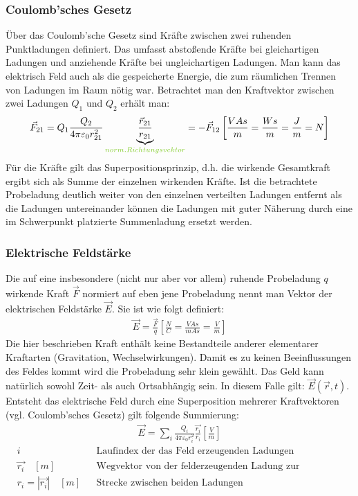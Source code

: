\documentclass[12pt,a4paper]{article}%
\let\harvardleftorig\harvardleft
\numberwithin{equation}{section}
\newcommand\citeVgl
{\def\harvardleft{(Vgl.\ \global\let\harvardleft\harvardleftorig}%
 \cite
}
\def\colGreen#1{\begingroup\color{LimeGreen}{#1}\endgroup}
\begin{document}
\subsubsection{Coulomb'sches Gesetz}
Über das Coulomb'sche Gesetz sind Kräfte zwischen zwei ruhenden Punktladungen definiert. Das umfasst abstoßende Kräfte bei gleichartigen Ladungen und anziehende Kräfte bei ungleichartigen Ladungen. \citeVgl{GDE12} Man kann das elektrisch Feld auch als die gespeicherte Energie, die zum räumlichen Trennen von Ladungen im Raum nötig war. \citeVgl{EleT} 
Betrachtet man den Kraftvektor zwischen zwei Ladungen $Q_1$ und $Q_2$ erhält man:
\begin{align}
\vec{F}_{21} = Q_1 \frac{Q_2}{4 \pi \varepsilon_0 r_{21}^2} \underbrace{\frac{\vec{r}_{21}}{r_{21}}}_{\colGreen{norm. Richtungsvektor}}
= -\vec{F}_{12} \left[\frac{VAs}{m} = \frac{Ws}{m} = \frac{J}{m} = N \right]
\end{align}
Für die Kräfte gilt das Superpositionsprinzip, d.h. die wirkende Gesamtkraft ergibt sich als Summe der einzelnen wirkenden Kräfte. Ist die betrachtete Probeladung deutlich weiter von den einzelnen verteilten Ladungen entfernt als die Ladungen untereinander können die Ladungen mit guter Näherung durch eine im Schwerpunkt platzierte Summenladung ersetzt werden. \citeVgl{GDE12}

\subsubsection{Elektrische Feldstärke}
Die auf eine insbesondere (nicht nur aber vor allem) ruhende Probeladung $q$ wirkende Kraft $\vec{F}$ normiert auf eben jene Probeladung nennt man Vektor der elektrischen Feldstärke $\vec{E}$. \citeVgl{GDE12}
Sie ist wie folgt definiert:
\begin{align}
\vec{E} = \frac{\vec{F}}{q} \left[\frac{N}{C} = \frac{VAs}{mAs} = \frac{V}{m} \right]
\end{align}
Die hier beschrieben Kraft enthält keine Bestandteile anderer elementarer Kraftarten (Gravitation, Wechselwirkungen). Damit es zu keinen Beeinflussungen des Feldes kommt wird die Probeladung sehr klein gewählt. Das Geld kann natürlich sowohl Zeit- als auch Ortsabhängig sein. In diesem Falle gilt: $\vec{E}(\vec{r},t)$. Entsteht das elektrische Feld durch eine Superposition mehrerer Kraftvektoren (vgl. Coulomb'sches Gesetz) gilt folgende Summierung:
\begin{align}
\vec{E} = \sum_i \frac{Q_i}{4\pi \varepsilon_0 r_i^2} \frac{\vec{r_i}}{r_i} \left[\frac{V}{m} \right]
\end{align}
\begin{align*}
&i &&\text{Laufindex der das Feld erzeugenden Ladungen} \\
&\vec{r_i} \quad [m] &&\text{Wegvektor von der felderzeugenden Ladung zur Probeladung} \\
&r_i = \left| \vec{r_i} \right| \quad [m] &&\text{Strecke zwischen beiden Ladungen}
\end{align*}
\end{document}
